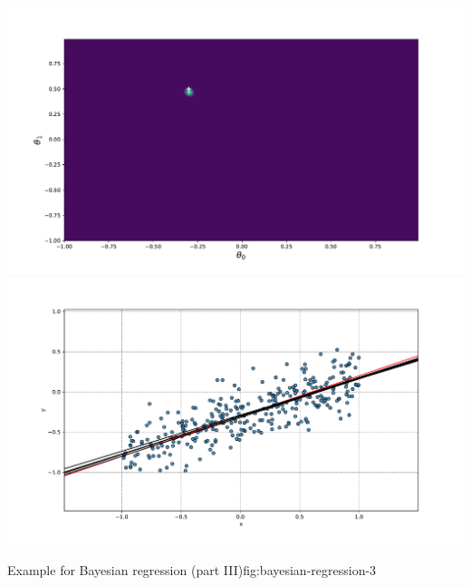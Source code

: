 \begin{frame}
{\begin{minipage}{0.45\textwidth}
			\includegraphics[scale=0.17]{18_advanced_regression/02_img/posterior_300} \\[-2mm]
			\includegraphics[scale=0.17]{18_advanced_regression/02_img/samples_300}
		\end{minipage}
	}{Example for Bayesian regression (part III)}{fig:bayesian-regression-3}
\end{frame}


